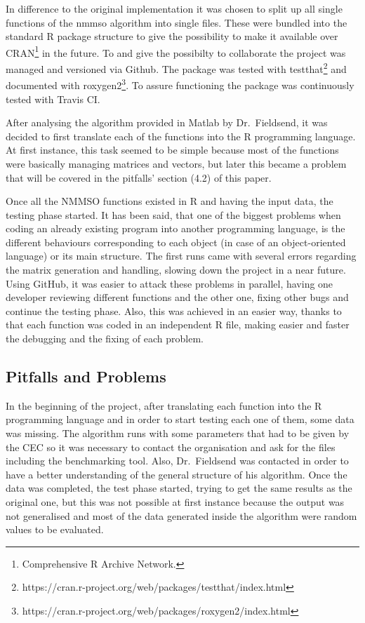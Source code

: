 \documentclass[12pt,a4paper]{article}
\begin{document}
In difference to the original implementation it was chosen to split up
all single functions of the nmmso algorithm into single files. These
were bundled into the standard R package structure to give the
possibility to make it available over CRAN\footnote{Comprehensive R
  Archive Network.} in the future. To and give the possibilty to
collaborate the project was managed and versioned via Github. The
package was tested with testthat\footnote{https://cran.r-project.org/web/packages/testthat/index.html}
and documented with roxygen2\footnote{https://cran.r-project.org/web/packages/roxygen2/index.html}.
To assure functioning the package was continuously tested with Travis
CI.

After analysing the algorithm provided in Matlab by Dr.~Fieldsend, it
was decided to first translate each of the functions into the R
programming language. At first instance, this task seemed to be simple
because most of the functions were basically managing matrices and
vectors, but later this became a problem that will be covered in the
pitfalls' section (4.2) of this paper.

Once all the NMMSO functions existed in R and having the input data, the
testing phase started. It has been said, that one of the biggest
problems when coding an already existing program into another
programming language, is the different behaviours corresponding to each
object (in case of an object-oriented language) or its main structure.
The first runs came with several errors regarding the matrix generation
and handling, slowing down the project in a near future. Using GitHub,
it was easier to attack these problems in parallel, having one developer
reviewing different functions and the other one, fixing other bugs and
continue the testing phase. Also, this was achieved in an easier way,
thanks to that each function was coded in an independent R file, making
easier and faster the debugging and the fixing of each problem.

\subsection{Pitfalls and Problems}\label{pitfalls-and-problems}

In the beginning of the project, after translating each function into
the R programming language and in order to start testing each one of
them, some data was missing. The algorithm runs with some parameters
that had to be given by the CEC so it was necessary to contact the
organisation and ask for the files including the benchmarking tool.
Also, Dr.~Fieldsend was contacted in order to have a better
understanding of the general structure of his algorithm. Once the data
was completed, the test phase started, trying to get the same results as
the original one, but this was not possible at first instance because
the output was not generalised and most of the data generated inside the
algorithm were random values to be evaluated.
\end{document}
